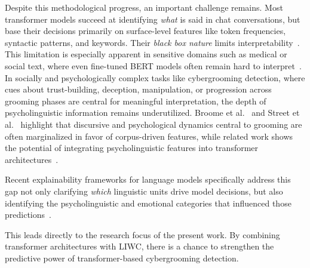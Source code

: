 Despite this methodological progress, an important challenge remains. Most transformer models succeed at identifying \emph{what} is said in chat conversations, but base their decisions primarily on surface-level features like token frequencies, syntactic patterns, and keywords. Their \textit{black box nature} limits interpretability~\cite{mersha2025explainabilityneuralnetworksnatural,lokesh2025xai}. This limitation is especially apparent in sensitive domains such as medical or social text, where even fine-tuned BERT models often remain hard to interpret~\cite{talebi2024exploring}. In socially and psychologically  complex tasks like cybergrooming detection, where cues about trust-building, deception, manipulation, or progression across grooming phases are central for meaningful interpretation, the depth of psycholinguistic information remains underutilized. Broome et al.~\cite{broome2020psycholinguistic} and Street et al.~\cite{street2024grooming} highlight that discursive and psychological dynamics central to grooming are often marginalized in favor of corpus-driven features, while related work shows the potential of integrating psycholinguistic features into transformer architectures~\cite{maharjan2025llmliwc,zwanwar2022emotion,kerz2022transformers}.

Recent explainability frameworks for language models specifically address this gap not only clarifying \emph{which} linguistic units drive model decisions, but also identifying the psycholinguistic and emotional categories that influenced those predictions~\cite{maharjan2025llmliwc,zwanwar2022emotion,lokesh2025xai,ribeiro2024methodologyexplainablelargelanguage}.

This leads directly to the research focus of the present work. By combining transformer architectures with LIWC, there is a chance to strengthen the predictive power of transformer-based cybergrooming detection.


